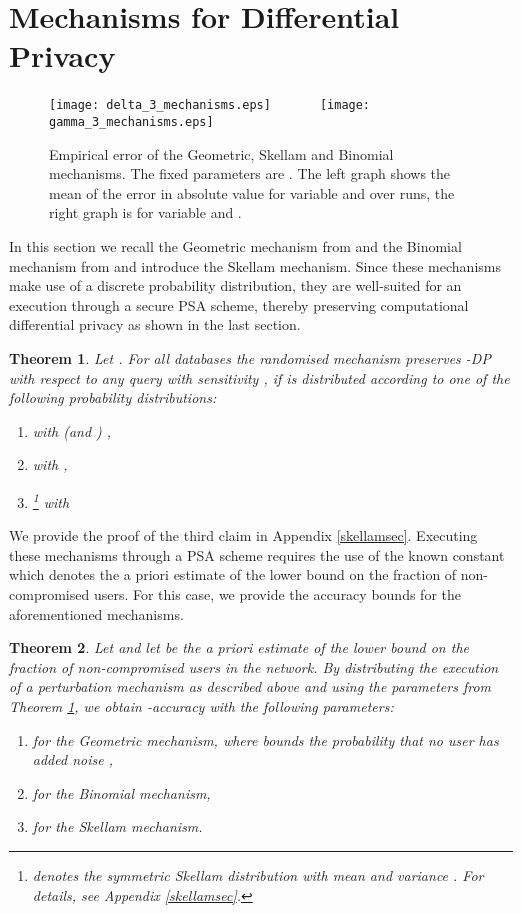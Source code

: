 \documentclass[10pt]{extarticle}
\newtheorem{Thm}{Theorem}
\begin{document}
\section{Mechanisms for Differential Privacy}\label{dpmech}

\begin{figure*}\centering
\texttt{[image: delta\_3\_mechanisms.eps]}\,\,\,\,\,\,\,\,\,\,\,\,\,\,\,\,\,\,\,\,\,\texttt{[image: gamma\_3\_mechanisms.eps]}
\caption{Empirical error of the Geometric, Skellam and Binomial mechanisms. The fixed parameters are . The left graph shows the mean of the error in absolute value for variable  and  over  runs, the right graph is for variable  and .}\label{accuracycomp}
\end{figure*}

In this section we recall the Geometric mechanism from \cite{2} and the Binomial mechanism from \cite{14} and introduce the Skellam mechanism. Since these mechanisms make use of a discrete probability distribution, they are well-suited for an execution through a secure PSA scheme, thereby preserving computational differential privacy as shown in the last section.

\begin{Thm}\label{privthm} Let . For all databases  the randomised mechanism 
preserves -\mbox{\upshape\sffamily DP} with respect to any query  with sensitivity , if  is distributed according to one of the following probability distributions:
\begin{enumerate}
\item  with  (and ) ,
\item  with  ,
\item \footnote{ denotes the symmetric Skellam distribution with mean  and variance . For details, see Appendix \ref{skellamsec}.} with 

\end{enumerate}
\end{Thm}

We provide the proof of the third claim in Appendix \ref{skellamsec}. Executing these mechanisms through a PSA scheme requires the use of the known constant  which denotes the a priori estimate of the lower bound on the fraction of non-compromised users. For this case, we provide the accuracy bounds for the aforementioned mechanisms.

\begin{Thm}\label{errorthm} Let  and let  be the a priori estimate of the lower bound on the fraction of non-compromised users in the network. By distributing the execution of a perturbation mechanism as described above and using the parameters from Theorem \ref{privthm}, we obtain -accuracy with the following parameters:
\begin{enumerate}
\item  for the Geometric mechanism, where  bounds the probability that no user has added noise ,
\item  for the Binomial mechanism,
\item  for the Skellam mechanism.
\end{enumerate}
\end{Thm}
\end{document}

